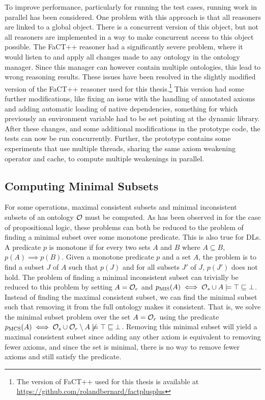 To improve performance, particularly for running the test cases, running work in parallel has been considered. One problem with this approach is that all reasoners are linked to a global  object. There is a concurrent version of this object, but not all reasoners are implemented in a way to make concurrent access to this object possible. The FaCT++ reasoner \cite{factpp} had a significantly severe problem, where it would listen to and apply all changes made to any ontology in the ontology manager. Since this manager can however contain multiple ontologies, this lead to wrong reasoning results. These issues have been resolved in the slightly modified version of the FaCT++ reasoner used for this thesis.\footnote{The version of FaCT++ used for this thesis is available at \url{https://github.com/rolandbernard/factplusplus}} This version had some further modifications, like fixing an issue with the handling of annotated axioms and adding automatic loading of native dependencies, something for which previously an environment variable had to be set pointing at the dynamic library. After these changes, and some additional modifications in the prototype code, the tests can now be run concurrently. Further, the prototype contains some experiments that use multiple threads, sharing the same axiom weakening operator and cache, to compute multiple weakenings in parallel.

\subsection{Computing Minimal Subsets}\label{minimal-set-impl}

For some operations, maximal consistent subsets and minimal inconsistent subsets of an ontology $\mathcal{O}$ must be computed. As has been observed in \cite{marques2013minimal} for the case of propositional logic, these problems can both be reduced to the problem of finding a minimal subset over some monotone predicate. This is also true for DLs. A predicate $p$ is monotone if for every two sets $A$ and $B$ where $A \subseteq B$, $p(A) \implies p(B)$. Given a monotone predicate $p$ and a set $A$, the problem is to find a subset $J$ of $A$ such that $p(J)$ and for all subsets $J'$ of $J$, $p(J')$ does not hold. The problem of finding a minimal inconsistent subset can trivially be reduced to this problem by setting $A = \mathcal{O}_r$ and $p_\textnormal{MIS}(A) \iff \mathcal{O}_s \cup A \models \top \sqsubseteq \bot$. Instead of finding the maximal consistent subset, we can find the minimal subset such that removing it from the full ontology makes it consistent. That is, we solve the minimal subset problem over the set $A = \mathcal{O}_r$ using the predicate $p_\textnormal{MCS}(A) \iff \mathcal{O}_s \cup \mathcal{O}_r \setminus A \not\models \top \sqsubseteq \bot$. Removing this minimal subset will yield a maximal consistent subset since adding any other axiom is equivalent to removing fewer axioms, and since the set is minimal, there is no way to remove fewer axioms and still satisfy the predicate.

